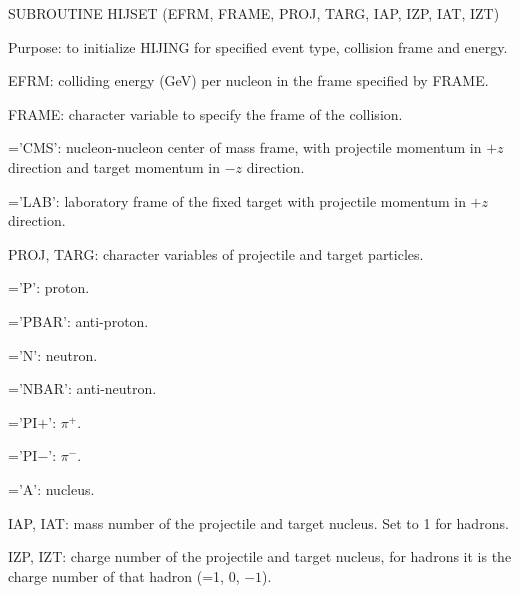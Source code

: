 \begin{description}
\itemsep=-4.0pt
\item{}SUBROUTINE  HIJSET (EFRM, FRAME, PROJ, TARG, IAP, IZP, IAT, IZT)
\item{}Purpose: to initialize HIJING for specified event type, collision
                frame and energy. 
\item{}EFRM: colliding energy (GeV) per nucleon in the frame specified 
                by FRAME.
\item{}FRAME: character variable to specify the frame of the collision.
        \vspace{-12.0pt}
        \begin{description}
        \itemsep=-4.0pt
                \item{}='CMS': nucleon-nucleon center of mass frame, 
                        with projectile momentum in $+z$ direction and 
                        target momentum in $-z$ direction.
                \item{}='LAB': laboratory frame of the fixed target with
                        projectile momentum in $+z$ direction.
        \end{description}
        \vspace{-4.0pt}
\item{}PROJ, TARG: character variables of projectile and target particles.
        \vspace{-12.0pt}
        \begin{description}
        \itemsep=-4.0pt
                \item{}='P': proton.
                \item{}='PBAR': anti-proton.
                \item{}='N': neutron.
                \item{}='NBAR': anti-neutron.
                \item{}='PI$+$': $\pi^+$.
                \item{}='PI$-$': $\pi^-$.
                \item{}='A': nucleus.
        \end{description}
        \hspace{-4.0pt}
\item{}IAP, IAT: mass number of the projectile and target nucleus. Set
                to 1 for hadrons.
\item{}IZP, IZT: charge number of the projectile and target nucleus, for
                hadrons it is the charge number of that hadron (=1, 0, $-1$).
\end{description}

